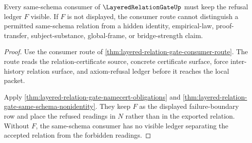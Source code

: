 \begin{theorem}
\label{thm:layered-relation-gate-ledger-obligation}
Every same-schema consumer of $\LayeredRelationGateUp$ must keep the refusal ledger $F$ visible. If $F$ is not displayed, the consumer route cannot distinguish a permitted same-schema relation from a hidden identity, empirical-law, proof-transfer, subject-substance, global-frame, or bridge-strength claim.
\end{theorem}
\begin{proof}
Use the consumer route of \autoref{thm:layered-relation-gate-consumer-route}. The route reads the relation-certificate source, concrete certificate surface, force inter-history relation surface, and axiom-refusal ledger before it reaches the local packet.

Apply \autoref{thm:layered-relation-gate-namecert-obligations} and \autoref{thm:layered-relation-gate-same-schema-nonidentity}. They keep $F$ as the displayed failure-boundary row and place the refused readings in $N$ rather than in the exported relation. Without $F$, the same-schema consumer has no visible ledger separating the accepted relation from the forbidden readings.
\end{proof}

